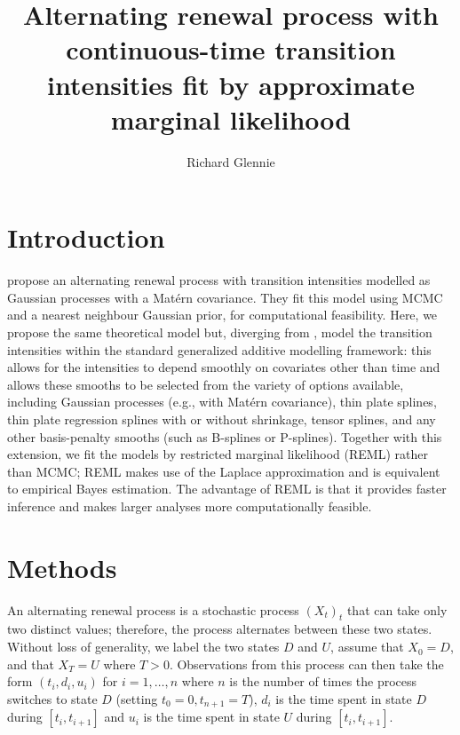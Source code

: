 \documentclass[referee]{rgclass}
\begin{document}
\title{Alternating renewal process with continuous-time transition intensities fit by approximate marginal likelihood}
\author{Richard Glennie}

%

\maketitle


\section{Introduction}

\citet{schliep2018alternating} propose an alternating renewal process with transition intensities modelled as Gaussian processes with a Mat\'ern covariance. They fit this model using MCMC and a nearest neighbour Gaussian prior, for computational feasibility. Here, we propose the same theoretical model but, diverging from \citet{schliep2018alternating}, model the transition intensities within the standard generalized additive modelling framework: this allows for the intensities to depend smoothly on covariates other than time and allows these smooths to be selected from the variety of options available, including Gaussian processes (e.g., with Mat\'ern covariance), thin plate splines,  thin plate regression splines with or without shrinkage, tensor splines, and any other basis-penalty smooths (such as B-splines or P-splines). Together with this extension, we fit the models by restricted marginal likelihood (REML) rather than MCMC; REML makes use of the Laplace approximation and is equivalent to empirical Bayes estimation. The advantage of REML is that it provides faster inference and makes larger analyses more computationally feasible. 

\section{Methods} 
\label{sec:mod} 

An alternating renewal process \citep{norris1998markov} is a stochastic process $(X_t)_t$ that can take only two distinct values; therefore, the process alternates between these two states. Without loss of generality, we label the two states $D$ and $U$, assume that $X_0 = D$, and that $X_T = U$ where $T > 0$.  Observations from this process can then take the form $(t_i, d_i, u_i)$ for $i = 1,\ldots,n$ where $n$ is the number of times the process switches to state $D$ (setting $t_0 = 0, t_{n + 1} = T$), $d_i$ is the time spent in state $D$ during $[t_i, t_{i+1}]$ and $u_i$ is the time spent in state $U$ during $[t_i, t_{i+1}]$. 
\end{document}
